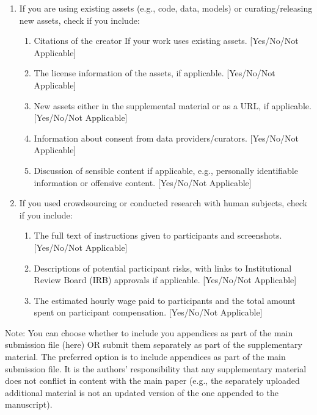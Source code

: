 \documentclass[twoside]{article}
\begin{document}
\begin{enumerate}
  \item If you are using existing assets (e.g., code, data, models) or curating/releasing new assets, check if you include:
  \begin{enumerate}
    \item Citations of the creator If your work uses existing assets. [Yes/No/Not Applicable]
    \item The license information of the assets, if applicable. [Yes/No/Not Applicable]
    \item New assets either in the supplemental material or as a URL, if applicable. [Yes/No/Not Applicable]
    \item Information about consent from data providers/curators. [Yes/No/Not Applicable]
    \item Discussion of sensible content if applicable, e.g., personally identifiable information or offensive content. [Yes/No/Not Applicable]
  \end{enumerate}

  \item If you used crowdsourcing or conducted research with human subjects, check if you include:
  \begin{enumerate}
    \item The full text of instructions given to participants and screenshots. [Yes/No/Not Applicable]
    \item Descriptions of potential participant risks, with links to Institutional Review Board (IRB) approvals if applicable. [Yes/No/Not Applicable]
    \item The estimated hourly wage paid to participants and the total amount spent on participant compensation. [Yes/No/Not Applicable]
  \end{enumerate}

\end{enumerate}



\clearpage
\appendix
\thispagestyle{empty}

\onecolumn
{}

Note: You can choose whether to include you appendices as part of the main submission file (here) OR submit them separately as part of the supplementary material. The preferred option is to include appendices as part of the main submission file. It is the authors' responsibility that any supplementary material does not conflict in content with the main paper (e.g., the separately uploaded additional material is not an updated version of the one appended to the manuscript).
\end{document}
